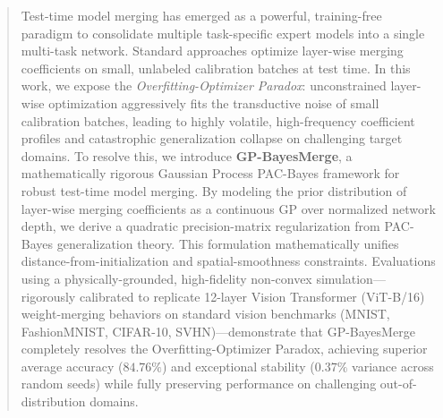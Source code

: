 \begin{abstract}
Test-time model merging has emerged as a powerful, training-free paradigm to
consolidate multiple task-specific expert models into a single multi-task
network. Standard approaches optimize layer-wise merging coefficients on small,
unlabeled calibration batches at test time. In this work, we expose the
\emph{Overfitting-Optimizer Paradox}: unconstrained layer-wise optimization
aggressively fits the transductive noise of small calibration batches, leading
to highly volatile, high-frequency coefficient profiles and catastrophic
generalization collapse on challenging target domains. To resolve this, we
introduce \textbf{GP-BayesMerge}, a mathematically rigorous Gaussian Process
PAC-Bayes framework for robust test-time model merging. By modeling the prior
distribution of layer-wise merging coefficients as a continuous GP over
normalized network depth, we derive a quadratic precision-matrix regularization
from PAC-Bayes generalization theory. This formulation mathematically unifies
distance-from-initialization and spatial-smoothness constraints. Evaluations
using a physically-grounded, high-fidelity non-convex simulation—rigorously
calibrated to replicate 12-layer Vision Transformer (ViT-B/16) weight-merging
behaviors on standard vision benchmarks (MNIST, FashionMNIST, CIFAR-10,
SVHN)—demonstrate that GP-BayesMerge completely resolves the
Overfitting-Optimizer Paradox, achieving superior average accuracy ($84.76\%$)
and exceptional stability ($0.37\%$ variance across random seeds) while fully
preserving performance on challenging out-of-distribution domains.
\end{abstract}
